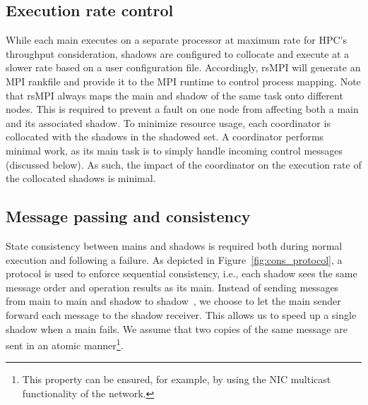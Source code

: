 \subsection{Execution rate control}
\label{sec:rate_control}
While each main executes on a separate processor at maximum rate for HPC's throughput consideration, shadows are configured to collocate and execute at a slower rate based on a user configuration file. Accordingly, rsMPI will generate an MPI rankfile and provide it to the MPI runtime to control process mapping. Note that rsMPI always maps the main and shadow of the same task onto different nodes. This is required to prevent a fault on one node from affecting  both a main and its associated  shadow.
To minimize resource usage, each coordinator is collocated with the shadows in the shadowed set. 
A coordinator performs  minimal work, as its main task is to simply handle incoming control messages (discussed below).  As such, the impact of the coordinator on the execution rate of the collocated shadows is minimal.



\subsection{Message passing and consistency}
State consistency between mains and shadows is required both during normal execution and following a failure. %
As depicted in Figure~\ref{fig:cons_protocol}, a protocol is used 
to enforce sequential consistency, i.e., each shadow sees the same message order and operation results as its main. 
Instead of sending messages from main to main and shadow to shadow~\cite{ferreira_sc_2011}, we choose to let the main sender forward each message to the shadow receiver. This allows us to speed up a single shadow when a main fails. 
We assume that two copies of the same message are sent in an atomic manner\footnote{This property can be ensured, for example, by using the NIC multicast functionality of the network.}.

